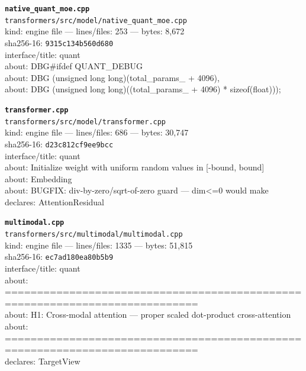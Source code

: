 \noindent\textbf{\texttt{native\_quant\_moe.cpp}}\\
\texttt{transformers/src/model/native\_quant\_moe.cpp}\\
kind: engine file --- lines/files: 253 --- bytes: 8,672\\
sha256-16: \texttt{9315c134b560d680}\\
interface/title: quant\\
about: DBG\#ifdef QUANT\_DEBUG\\
about: DBG           (unsigned long long)(total\_params\_ + 4096),\\
about: DBG           (unsigned long long)((total\_params\_ + 4096) * sizeof(float)));\\
\vspace*{6.0pt}

\noindent\textbf{\texttt{transformer.cpp}}\\
\texttt{transformers/src/model/transformer.cpp}\\
kind: engine file --- lines/files: 686 --- bytes: 30,747\\
sha256-16: \texttt{d23c812cf9ee9bcc}\\
interface/title: quant\\
about: Initialize weight with uniform random values in [-bound, bound]\\
about: Embedding\\
about: BUGFIX: div-by-zero/sqrt-of-zero guard — dim<=0 would make\\
declares: AttentionResidual\\
\vspace*{6.0pt}

\noindent\textbf{\texttt{multimodal.cpp}}\\
\texttt{transformers/src/multimodal/multimodal.cpp}\\
kind: engine file --- lines/files: 1335 --- bytes: 51,815\\
sha256-16: \texttt{ec7ad180ea80b5b9}\\
interface/title: quant\\
about: ============================================================================\\
about: H1: Cross-modal attention — proper scaled dot-product cross-attention\\
about: ============================================================================\\
declares: TargetView\\
\vspace*{6.0pt}

